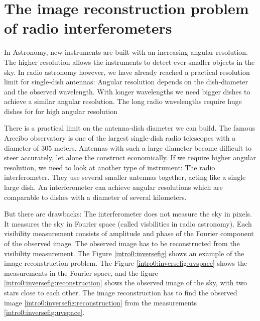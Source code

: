 \section{The image reconstruction problem of radio interferometers}
In Astronomy, new instruments are built with an increasing angular resolution. The higher resolution allows the instruments to detect ever smaller objects in the sky. In radio astronomy however, we have already reached a practical resolution limit for single-dish antennas: Angular resolution depends on the dish-diameter and the observed wavelength. With longer wavelengths we need bigger dishes to achieve a similar angular resolution. The long radio wavelengths require huge dishes for for high angular resolution

There is a practical limit on the antenna-dish diameter we can build. The famous Arecibo observatory is one of the largest single-dish radio telescopes with a diameter of 305 meters. Antennas with such a large diameter become difficult to steer accurately, let alone the construct economically. If we require higher angular resolution, we need to look at another type of instrument: The radio interferometer. They use several smaller antennas together, acting like a single large dish. An interferometer can achieve angular resolutions which are comparable to dishes with a diameter of several kilometers.

But there are drawbacks: The interferometer does not measure the sky in pixels. It measures the sky in Fourier space (called visbilities in radio astronomy). Each visibility measurement consists of amplitude and phase of the Fourier component of the observed image. The observed image has to be reconstructed from the visibility measurement. The Figure \ref{intro0:inversefig} shows an example of the image reconstruction problem. The Figure \ref{intro0:inversefig:uvspace} shows the measurements in the Fourier space, and the figure \ref{intro0:inversefig:reconstruction} shows the observed image of the sky, with two stars close to each other. The image reconstruction has to find the observed image \ref{intro0:inversefig:reconstruction} from the measurements \ref{intro0:inversefig:uvspace}. 

